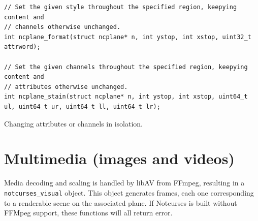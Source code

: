 \documentclass[letterpaper,10pt]{article}
\begin{document}
\begin{listing}[!htb]
\begin{verbatim}
// Set the given style throughout the specified region, keepying content and
// channels otherwise unchanged.
int ncplane_format(struct ncplane* n, int ystop, int xstop, uint32_t attrword);

// Set the given channels throughout the specified region, keepying content and
// attributes otherwise unchanged.
int ncplane_stain(struct ncplane* n, int ystop, int xstop, uint64_t ul, uint64_t ur, uint64_t ll, uint64_t lr);
\end{verbatim}
\caption{Changing attributes or channels in isolation.}
\label{list:stain}
\end{listing}

\cleardoublepage


\cleardoublepage

\section{Multimedia (images and videos)}
\label{sec:libav}

Media decoding and scaling is handled by libAV from FFmpeg, resulting in a
\texttt{notcurses\_visual} object. This object generates frames, each one
corresponding to a renderable scene on the associated plane. If Notcurses
is built without FFMpeg support, these functions will all return error.
\end{document}
